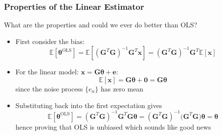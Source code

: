 \documentclass[12pt]{article}
\newcommand{\mexp}{\mathbb{E}}
\newcommand{\proc}[1]{\{ #1_n\}}
\newcommand{\OLS}{\textrm{OLS}}
\newcommand{\thetab}{\boldsymbol{\theta}}
\newcommand{\thetaols}{\thetab^\OLS}
\begin{document}
\subsubsection{Properties of the Linear Estimator}
What are the properties and could we ever do better than OLS?
\begin{itemize}
    \item First consider the bias:
    \[
    \mexp[\thetaols] = \mexp[(\mathbf{G}^T\mathbf{G})^{-1}\mathbf{G}^T\mathbf{x}] = (\mathbf{G}^T\mathbf{G})^{-1}\mathbf{G}^T\mexp[\mathbf{x}]
    \]
    \item For the linear model: $\mathbf{x = G \thetab + e}$:
    \[
    \mexp[\mathbf{x}] = \mathbf{G \thetab + 0} = \mathbf{G \thetab}
    \]
    since the noise process $\proc{e}$ has zero mean
    \item Substituting back into the first expectation gives
    \[
    \mexp[\thetaols] = (\mathbf{G}^T\mathbf{G})^{-1}\mathbf{G}^T \mathbf{G \thetab} = (\mathbf{G}^T\mathbf{G})^{-1}(\mathbf{G}^T \mathbf{G) \thetab} = \thetab
    \]
    hence proving that OLS is unbiased which sounds like good news
\end{itemize}
\end{document}
